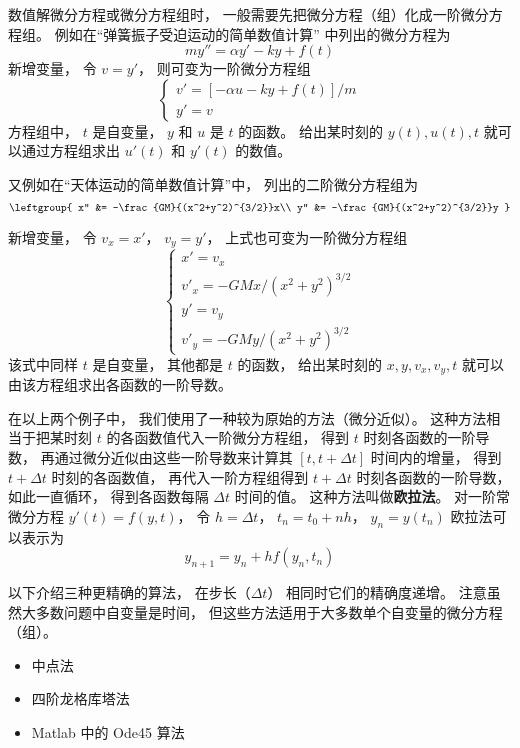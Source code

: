 

数值解微分方程或微分方程组时， 一般需要先把微分方程（组）化成一阶微分方程组。 例如在“弹簧振子受迫运动的简单数值计算” 中列出的微分方程为
\begin{equation}
m y'' = \alpha y' - ky + f(t)
\end{equation}
新增变量， 令 $v = y'$， 则可变为一阶微分方程组
\begin{equation}
\begin{cases}
v' = [-\alpha u - ky + f(t)]/m\\
y' = v
\end{cases}
\end{equation}
方程组中， $t$ 是自变量， $y$ 和 $u$ 是 $t$ 的函数。 给出某时刻的 $y(t), u(t), t$ 就可以通过方程组求出 $u'(t)$ 和 $y'(t)$ 的数值。

又例如在“天体运动的简单数值计算”中， 列出的二阶微分方程组为
\begin{equation}
\leftgroup{
x'' &= -\frac{GM}{(x^2+y^2)^{3/2}}x\\
y'' &= -\frac{GM}{(x^2+y^2)^{3/2}}y
}\end{equation}

新增变量， 令 $v_x = x'$， $v_y = y'$， 上式也可变为一阶微分方程组
\begin{equation}\label{OdeNum_eq4}
\begin{cases}
x' = v_x\\
v'_x = -GMx/(x^2 + y^2)^{3/2}\\
y' = v_y\\
v'_y = -GMy/(x^2 + y^2)^{3/2}
\end{cases}
\end{equation}
该式中同样 $t$ 是自变量， 其他都是 $t$ 的函数， 给出某时刻的 $x, y, v_x, v_y, t$ 就可以由该方程组求出各函数的一阶导数。

在以上两个例子中， 我们使用了一种较为原始的方法（微分近似）。 这种方法相当于把某时刻 $t$ 的各函数值代入一阶微分方程组， 得到 $t$ 时刻各函数的一阶导数， 再通过微分近似由这些一阶导数来计算其 $[t, t + \Delta t]$ 时间内的增量， 得到 $t +\Delta t$ 时刻的各函数值， 再代入一阶方程组得到 $t +\Delta t$ 时刻各函数的一阶导数， 如此一直循环， 得到各函数每隔 $\Delta t$ 时间的值。 这种方法叫做\textbf{欧拉法}。 对一阶常微分方程 $y'(t) = f(y, t)$， 令 $h = \Delta t$， $t_n = t_0 + nh$， $y_n = y(t_n)$ 欧拉法可以表示为
\begin{equation}\label{OdeNum_eq5}
y_{n+1} = y_n + h f(y_n, t_n)
\end{equation}

以下介绍三种更精确的算法， 在步长（$\Delta t$） 相同时它们的精确度递增。 注意虽然大多数问题中自变量是时间， 但这些方法适用于大多数单个自变量的微分方程（组）。

\begin{itemize}
\item 中点法
\item 四阶龙格库塔法
\item Matlab 中的 Ode45 算法
\end{itemize}












